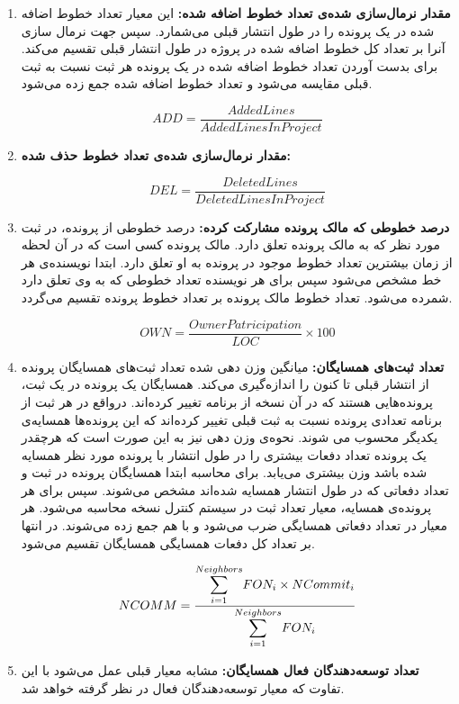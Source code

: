 \begin{enumerate}

	\item
	\textbf{مقدار نرمال‌سازی شده‌ی تعداد خطوط اضافه شده:}
	این معیار تعداد خطوط اضافه شده در یک پرونده را در طول انتشار قبلی می‌شمارد. سپس جهت نرمال سازی آنرا بر تعداد کل خطوط اضافه شده در پروژه در طول انتشار قبلی تقسیم می‌کند. برای بدست آوردن تعداد خطوط اضافه شده در یک پرونده هر ثبت نسبت به ثبت قبلی مقایسه می‌شود و تعداد خطوط اضافه شده جمع زده می‌شود.
\begin{latin}
\[
ADD = \frac{AddedLines}{AddedLinesInProject}
\]
\end{latin}
	
	\item
	\textbf{مقدار نرمال‌سازی شده‌ی تعداد خطوط حذف شده:}

\begin{latin}
	\[
	DEL = \frac{DeletedLines}{DeletedLinesInProject}
	\]
\end{latin}
	\item
	\textbf{درصد خطوطی که مالک پرونده مشارکت کرده:}
	درصد خطوطی  از پرونده، در  ثبت مورد نظر  که به مالک پرونده تعلق دارد. مالک پرونده کسی است که در آن لحظه از زمان بیشترین تعداد خطوط موجود در پرونده به او تعلق دارد. ابتدا نویسنده‌ی هر خط مشخص می‌شود سپس برای هر نویسنده تعداد خطوطی که به وی تعلق دارد شمرده می‌شود. تعداد خطوط مالک پرونده بر تعداد خطوط پرونده تقسیم می‌گردد.
	\begin{latin}
		\[
		OWN = \frac{OwnerPatricipation}{LOC} \times 100
		\]
	\end{latin}

	\item
	\textbf{تعداد ثبت‌های همسایگان:}
	میانگین وزن دهی شده تعداد ثبت‌های همسایگان پرونده از انتشار قبلی تا کنون را اندازه‌گیری می‌کند. همسایگان یک پرونده در یک ثبت، پرونده‌هایی هستند که در آن نسخه از برنامه تغییر کرده‌اند. در‌واقع در هر ثبت از برنامه تعدادی پرونده نسبت به ثبت قبلی تغییر کرده‌اند که این پرونده‌ها همسایه‌ی یکدیگر محسوب می شوند. نحوه‌ی وزن دهی نیز به این صورت است که هرچقدر یک پرونده تعداد دفعات بیشتری را در طول انتشار با پرونده مورد نظر همسایه شده باشد وزن بیشتری می‌یابد. برای محاسبه ابتدا همسایگان پرونده در ثبت  و تعداد دفعاتی که  در طول انتشار همسایه شده‌اند مشخص می‌شوند. سپس برای هر پرونده‌ی همسایه، معیار تعداد ثبت در سیستم کنترل نسخه محاسبه می‌شود. هر معیار در تعداد دفعاتی همسایگی ضرب می‌شود و با هم جمع زده می‌شوند. در انتها بر تعداد کل دفعات همسایگی همسایگان تقسیم می‌شود. 
\begin{latin}
\[
NCOMM = \frac{\mathlarger{\sum}\limits_{i=1}^{Neighbors} FON_i \times NCommit_i}{\mathlarger{\sum}\limits_{i=1}^{Neighbors}FON_i}
\]
\end{latin}
	\item
	\textbf{تعداد توسعه‌دهندگان فعال همسایگان:}
	مشابه معیار قبلی عمل می‌شود با این تفاوت که معیار توسعه‌دهندگان فعال در نظر گرفته خواهد شد.
	

\end{enumerate}
